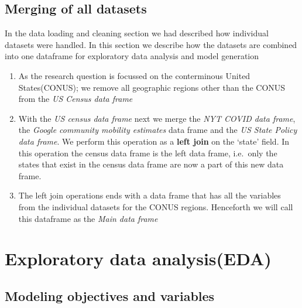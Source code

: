 \documentclass[
]{article}
\providecommand{\tightlist}{%
  \setlength{\itemsep}{0pt}\setlength{\parskip}{0pt}}
\begin{document}
\hypertarget{merging-of-all-datasets}{%
\subsection{Merging of all datasets}\label{merging-of-all-datasets}}

In the data loading and cleaning section we had described how individual
datasets were handled. In this section we describe how the datasets are
combined into one dataframe for exploratory data analysis and model
generation

\begin{enumerate}
\def\labelenumi{\arabic{enumi}.}
\tightlist
\item
  As the research question is focussed on the conterminous United
  States(CONUS); we remove all geographic regions other than the CONUS
  from the \emph{US Census data frame}
\item
  With the \emph{US census data frame} next we merge the \emph{NYT COVID
  data frame}, the \emph{Google community mobility estimates} data frame
  and the \emph{US State Policy data frame}. We perform this operation
  as a \textbf{left join} on the `state' field. In this operation the
  census data frame is the left data frame, i.e.~only the states that
  exist in the census data frame are now a part of this new data frame.
\item
  The left join operations ends with a data frame that has all the
  variables from the individual datasets for the CONUS regions.
  Henceforth we will call this dataframe as the \emph{Main data frame}
\end{enumerate}

\newpage

\hypertarget{exploratory-data-analysiseda}{%
\section{Exploratory data
analysis(EDA)}\label{exploratory-data-analysiseda}}

\hypertarget{modeling-objectives-and-variables}{%
\subsection{Modeling objectives and
variables}\label{modeling-objectives-and-variables}}
\end{document}
